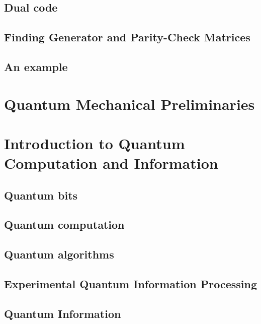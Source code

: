 \documentclass{article}
\theoremstyle{definition}
\begin{document}
\subsection{Dual code}

\subsection{Finding Generator and Parity-Check Matrices}

\subsection{An example}



\newpage







\section{Quantum Mechanical Preliminaries}
\newpage




















\section{Introduction to Quantum Computation and Information}
\newpage
\subsection{Quantum bits}
\newpage
\subsection{Quantum computation}
\newpage
\subsection{Quantum algorithms}
\newpage
\subsection{Experimental Quantum Information Processing}
\newpage
\subsection{Quantum Information}
\newpage

\newpage
\end{document}
